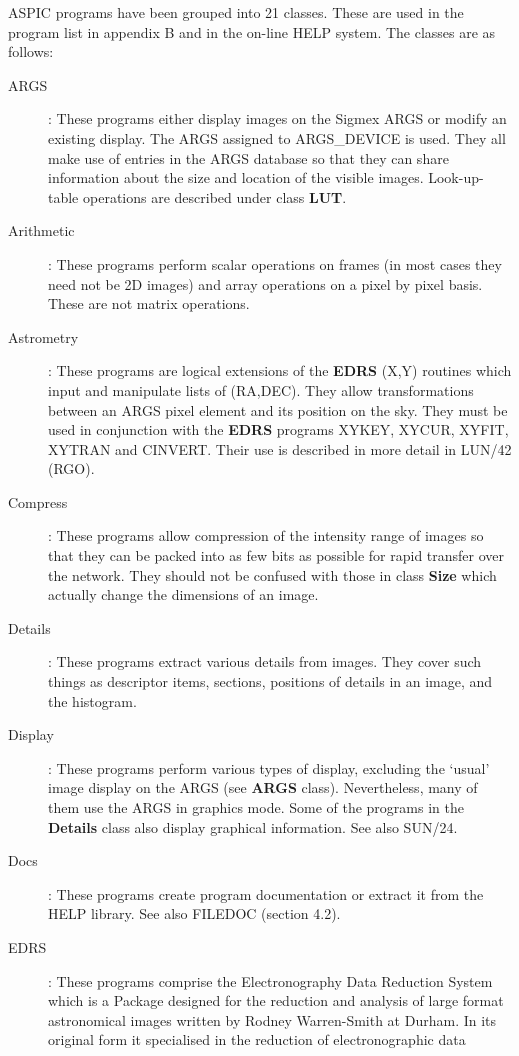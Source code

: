 ASPIC programs have been grouped into 21 classes.
These are used in the program list in appendix B and in the on-line HELP system.
The classes are as follows:
\begin{description}
\item [ARGS]:
These programs either display images on the Sigmex ARGS or modify an existing
display.
The ARGS assigned to ARGS\_DEVICE is used.
They all make use of entries in the ARGS database so that they can
share information about the size and location of the visible images.
Look-up-table operations are described under class {\bf LUT}.
\item [Arithmetic]:
These programs perform scalar operations on frames (in most cases they
need not be 2D images) and array operations on a pixel by pixel basis.
These are not matrix operations.
\item [Astrometry]:
These programs are logical extensions of the {\bf EDRS} (X,Y) routines which
input and manipulate lists of (RA,DEC).
They allow transformations between an ARGS pixel element and its position
on the sky.
They must be used in conjunction with the {\bf EDRS} programs XYKEY, XYCUR,
XYFIT, XYTRAN and CINVERT.
Their use is described in more detail in LUN/42 (RGO).
\item [Compress]:
These programs allow compression of the intensity range of images so that they
can be packed into as few bits as possible for rapid transfer over the network.
They should not be confused with those in class {\bf Size} which actually
change the dimensions of an image.
\item [Details]:
These programs extract various details from images.
They cover such things as descriptor items, sections, positions of details
in an image, and the histogram.
\item [Display]:
These programs perform various types of display, excluding the `usual' image
display on the ARGS (see {\bf ARGS} class).
Nevertheless, many of them use the ARGS in graphics mode.
Some of the programs in the {\bf Details} class also display graphical
information.
See also SUN/24.
\item [Docs]:
These programs create program documentation or extract it from the HELP
library.
See also FILEDOC (section 4.2).
\item [EDRS]:
These programs comprise the Electronography Data Reduction System which is a
Package designed for the reduction and analysis of large format astronomical
images written by Rodney Warren-Smith at Durham.
In its original form it specialised in the reduction of electronographic data

\end{description}
